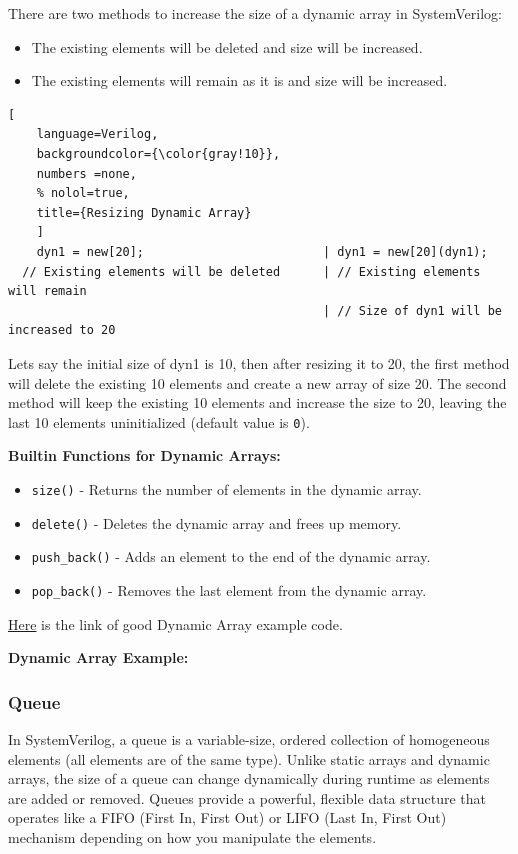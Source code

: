 \documentclass[12pt, a4paper]{article}
\begin{document}
There are two methods to increase the size of a dynamic array in SystemVerilog:
\begin{itemize}
    \item The existing elements will be deleted and size will be increased.
    \item The existing elements will remain as it is and size will be increased.
\end{itemize}

\begin{lstlisting}[
    language=Verilog,
    backgroundcolor={\color{gray!10}},
    numbers =none,
    % nolol=true,
    title={Resizing Dynamic Array}
    ]
    dyn1 = new[20];                         | dyn1 = new[20](dyn1);
  // Existing elements will be deleted      | // Existing elements will remain
                                            | // Size of dyn1 will be increased to 20
\end{lstlisting}

Lets say the initial size of dyn1 is 10, then after resizing it to 20, the first method will delete the existing 10 elements and create a new array of size 20. The second method will keep the existing 10 elements and increase the size to 20, leaving the last 10 elements uninitialized (default value is \texttt{0}).
\vspace{1em}

\textbf{Builtin  Functions for Dynamic Arrays:}
\begin{itemize}[nosep]
    \item \texttt{size()} - Returns the number of elements in the dynamic array.
    \item \texttt{delete()} - Deletes the dynamic array and frees up memory.
    \item \texttt{push\_back()} - Adds an element to the end of the dynamic array.
    \item \texttt{pop\_back()} - Removes the last element from the dynamic array.
\end{itemize}

\vspace{0.5em}

\href{https://vlsiverify.com/system-verilog/dynamic-array-in-sv/}{Here}
 is the link of good Dynamic Array example code.

\textbf{Dynamic Array Example:}



\subsubsection{Queue}
In SystemVerilog, a queue is a variable-size, ordered collection of homogeneous elements (all elements are of the same type). Unlike static arrays and dynamic arrays, the size of a queue can change dynamically during runtime as elements are added or removed. Queues provide a powerful, flexible data structure that operates like a FIFO (First In, First Out) or LIFO (Last In, First Out) mechanism depending on how you manipulate the elements.
\end{document}
